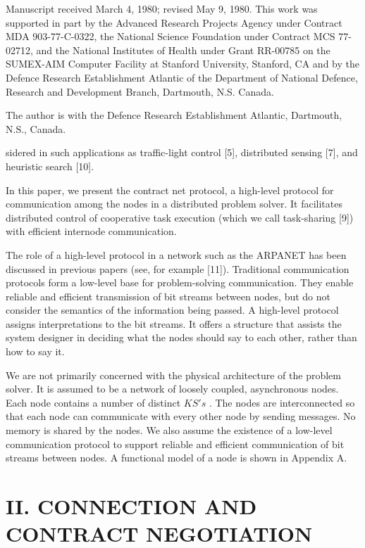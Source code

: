 \documentclass[
]{article}
\begin{document}
Manuscript received March 4, 1980; revised May 9, 1980. This work was
supported in part by the Advanced Research Projects Agency under
Contract MDA 903-77-C-0322, the National Science Foundation under
Contract MCS 77-02712, and the National Institutes of Health under Grant
RR-00785 on the SUMEX-AIM Computer Facility at Stanford University,
Stanford, CA and by the Defence Research Establishment Atlantic of the
Department of National Defence, Research and Development Branch,
Dartmouth, N.S. Canada.

The author is with the Defence Research Establishment Atlantic,
Dartmouth, N.S., Canada.

sidered in such applications as traffic-light control {[}5{]},
distributed sensing {[}7{]}, and heuristic search {[}10{]}.

In this paper, we present the contract net protocol, a high-level
protocol for communication among the nodes in a distributed problem
solver. It facilitates distributed control of cooperative task execution
(which we call task-sharing {[}9{]}) with efficient internode
communication.

The role of a high-level protocol in a network such as the ARPANET has
been discussed in previous papers (see, for example {[}11{]}).
Traditional communication protocols form a low-level base for
problem-solving communication. They enable reliable and efficient
transmission of bit streams between nodes, but do not consider the
semantics of the information being passed. A high-level protocol assigns
interpretations to the bit streams. It offers a structure that assists
the system designer in deciding what the nodes should say to each other,
rather than how to say it.

We are not primarily concerned with the physical architecture of the
problem solver. It is assumed to be a network of loosely coupled,
asynchronous nodes. Each node contains a number of distinct \(KS's\) .
The nodes are interconnected so that each node can communicate with
every other node by sending messages. No memory is shared by the nodes.
We also assume the existence of a low-level communication protocol to
support reliable and efficient communication of bit streams between
nodes. A functional model of a node is shown in Appendix A.

\section{II. CONNECTION AND CONTRACT
NEGOTIATION}\label{ii.-connection-and-contract-negotiation}
\end{document}
